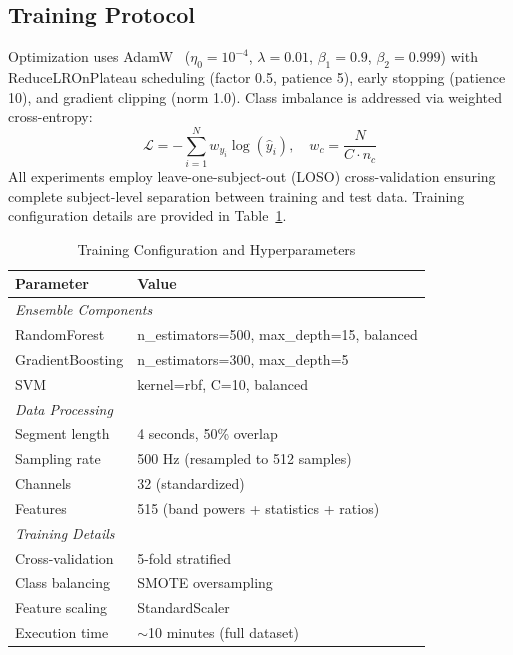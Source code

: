 \documentclass[journal,twoside]{IEEEtran}
\begin{document}
\subsection{Training Protocol}

Optimization uses AdamW~\cite{loshchilov2019decoupled} ($\eta_0=10^{-4}$, $\lambda=0.01$, $\beta_1=0.9$, $\beta_2=0.999$) with ReduceLROnPlateau scheduling (factor 0.5, patience 5), early stopping (patience 10), and gradient clipping (norm 1.0). Class imbalance is addressed via weighted cross-entropy:
\begin{equation}
\mathcal{L} = -\sum_{i=1}^{N} w_{y_i} \log(\hat{y}_i), \quad w_c = \frac{N}{C \cdot n_c}
\end{equation}
All experiments employ leave-one-subject-out (LOSO) cross-validation ensuring complete subject-level separation between training and test data. Training configuration details are provided in Table~\ref{tab:hyperparams}.

\begin{table}[t]
\centering
\caption{Training Configuration and Hyperparameters}
\label{tab:hyperparams}
\scriptsize
\begin{tabular}{ll}
\toprule
\textbf{Parameter} & \textbf{Value} \\
\midrule
\multicolumn{2}{l}{\textit{Ensemble Components}} \\
RandomForest & n\_estimators=500, max\_depth=15, balanced \\
GradientBoosting & n\_estimators=300, max\_depth=5 \\
SVM & kernel=rbf, C=10, balanced \\
\midrule
\multicolumn{2}{l}{\textit{Data Processing}} \\
Segment length & 4 seconds, 50\% overlap \\
Sampling rate & 500 Hz (resampled to 512 samples) \\
Channels & 32 (standardized) \\
Features & 515 (band powers + statistics + ratios) \\
\midrule
\multicolumn{2}{l}{\textit{Training Details}} \\
Cross-validation & 5-fold stratified \\
Class balancing & SMOTE oversampling \\
Feature scaling & StandardScaler \\
Execution time & $\sim$10 minutes (full dataset) \\
\bottomrule
\end{tabular}
\end{table}
\end{document}
